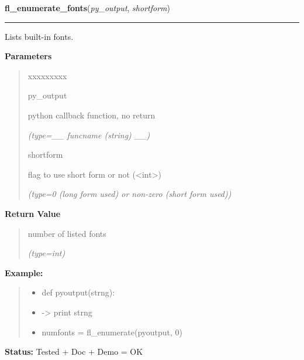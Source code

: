 \hspace{.8\funcindent}\begin{boxedminipage}{\funcwidth}

    \raggedright \textbf{fl\_enumerate\_fonts}(\textit{py\_output}, \textit{shortform})

    \vspace{-1.5ex}

    \rule{\textwidth}{0.5\fboxrule}
\setlength{\parskip}{2ex}
    Lists built-in fonts.

\setlength{\parskip}{1ex}
      \textbf{Parameters}
      \vspace{-1ex}

      \begin{quote}
        \begin{Ventry}{xxxxxxxxx}

          \item[py\_output]

          python callback function, no return

            {\it (type=\_\_ funcname (string) \_\_)}

          \item[shortform]

          flag to use short form or not ({\textless}int{\textgreater})

            {\it (type=0 (long form used) or non-zero (short form used))}

        \end{Ventry}

      \end{quote}

      \textbf{Return Value}
    \vspace{-1ex}

      \begin{quote}
      number of listed fonts

      {\it (type=int)}

      \end{quote}

\textbf{Example:}
\begin{quote}
  \begin{itemize}

  \item
    \setlength{\parskip}{0.6ex}
def pyoutput(strng):



  \item {\textbar}-{\textgreater}{\textbar} print strng



  \item numfonts = fl\_enumerate(pyoutput, 0)



\end{itemize}

\end{quote}

\textbf{Status:} Tested + Doc + Demo = OK



    \end{boxedminipage}

